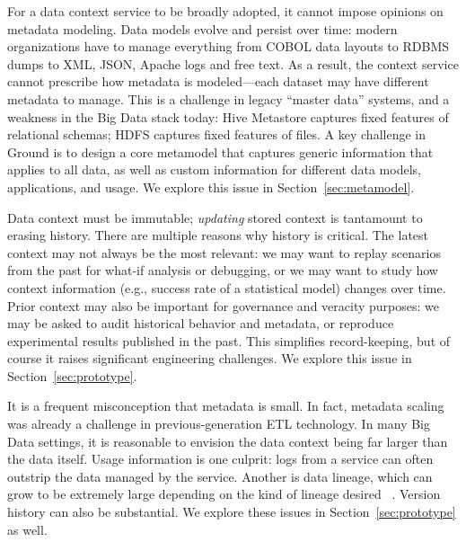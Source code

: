 \documentclass{sig-alternate}
\begin{document}
 For a data context service to be broadly adopted, it cannot impose opinions on metadata modeling. 
Data models evolve and persist over time: modern organizations have to manage everything from COBOL data layouts to RDBMS dumps to XML, JSON, Apache logs and free text. 
As a result, the context service cannot 
prescribe 
how metadata is modeled---each dataset may have different metadata to manage. 
This is a challenge in legacy ``master data'' systems, and  a weakness in the Big Data stack today: Hive Metastore captures fixed features of relational schemas; HDFS captures fixed features of files.  
A key challenge in Ground is to design a core metamodel that captures generic information that applies to all data, as well as custom information for different data models, applications, and usage.
We explore this issue in Section~\ref{sec:metamodel}.

 Data context must be immutable; \emph{updating} stored context is tantamount to erasing history. %
There are multiple reasons why history is critical. 
The latest context may not always be the most relevant: we may want to replay scenarios from the past for what-if analysis or debugging, or we may want to study how context information (e.g., success rate of a statistical model) changes over time.
Prior context may also be important for governance and veracity purposes: we may be asked to audit historical behavior and metadata, or reproduce experimental results published in the past. 
This simplifies record-keeping, but of course it raises significant engineering challenges.  
We explore this issue in Section~\ref{sec:prototype}.

 It is a frequent misconception that metadata is small. In fact, metadata scaling was already a challenge in previous-generation ETL technology. In many Big Data settings, it is reasonable to envision the data context being far larger than the data itself. Usage information is one culprit:  logs from a service can often outstrip the data managed by the service. Another is data lineage, which can grow to be extremely large
depending on the kind of lineage desired
~\cite{cheney2009provenance}.  Version history can also be substantial. 
We explore these issues in Section~\ref{sec:prototype} as well.
\end{document}
